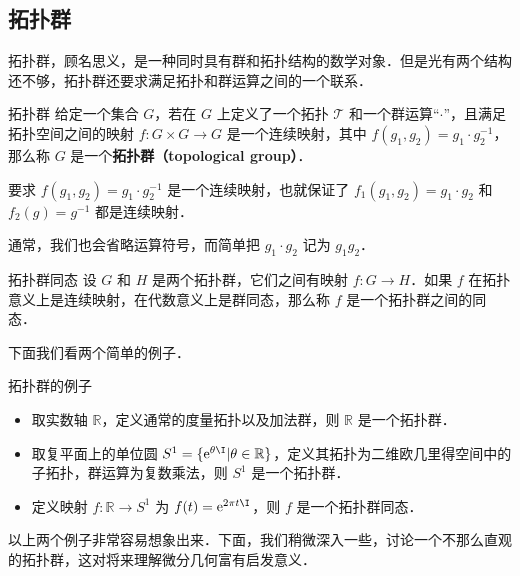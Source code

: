 


\subsection{拓扑群}
拓扑群，顾名思义，是一种同时具有群和拓扑结构的数学对象．但是光有两个结构还不够，拓扑群还要求满足拓扑和群运算之间的一个联系．

\begin{definition}{拓扑群}
给定一个集合 $G$，若在 $G$ 上定义了一个拓扑 $\mathcal{T}$ 和一个群运算“$\cdot$”，且满足拓扑空间之间的映射 $f:G\times G\rightarrow G$ 是一个连续映射，其中 $f(g_1, g_2)=g_1\cdot g_2^{-1}$，那么称 $G$ 是一个\textbf{拓扑群（topological group）}．
\end{definition}

要求 $f(g_1, g_2)=g_1\cdot g_2^{-1}$ 是一个连续映射，也就保证了 $f_1(g_1, g_2)=g_1\cdot g_2$ 和 $f_2(g)=g^{-1}$ 都是连续映射．

通常，我们也会省略运算符号，而简单把 $g_1\cdot g_2$ 记为 $g_1g_2$．

\begin{definition}{拓扑群同态}
设 $G$ 和 $H$ 是两个拓扑群，它们之间有映射 $f:G\rightarrow H$．如果 $f$ 在拓扑意义上是连续映射，在代数意义上是群同态，那么称 $f$ 是一个拓扑群之间的同态．
\end{definition}

下面我们看两个简单的例子．

\begin{example}{拓扑群的例子}\label{TopGrp_ex1}
\begin{itemize}
\item 取实数轴 $\mathbb{R}$，定义通常的度量拓扑以及加法群，则 $\mathbb{R}$ 是一个拓扑群．
\item 取复平面上的单位圆 $S^1=\{\mathrm{e}^{\theta\I}|\theta\in\mathbb{R}\}$，定义其拓扑为二维欧几里得空间中的子拓扑，群运算为复数乘法，则 $S^1$ 是一个拓扑群．
\item 定义映射 $f:\mathbb{R}\rightarrow S^1$ 为 $f(t)=\mathrm{e}^{2\pi t\I}$，则 $f$ 是一个拓扑群同态．
\end{itemize}
\end{example}

以上两个例子非常容易想象出来．下面，我们稍微深入一些，讨论一个不那么直观的拓扑群，这对将来理解微分几何富有启发意义．

